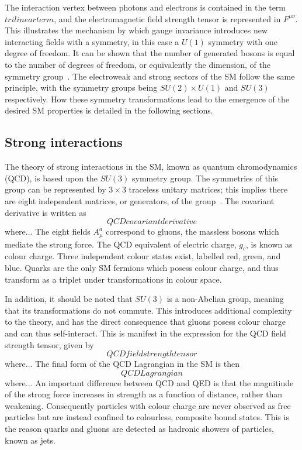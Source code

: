 The interaction vertex between photons and electrons is contained in the term $trilinear term$, 
and the electromagnetic field strength tensor is represented in $F^{\mu\nu}$.
This illustrates the mechanism by which gauge invariance introduces new interacting fields
with a symmetry, in this case a $U(1)$ symmetry with one degree of freedom.
It can be shown that the number of generated bosons is equal to the number of degrees of freedom, 
or equivalently the dimension, of the symmetry group~\cite{Peskin}.
The electroweak and strong sectors of the SM follow the same principle, 
with the symmetry groups being $SU(2) \times U(1)$ and $SU(3)$ respectively.
How these symmetry transformations lead to the emergence of the desired SM properties 
is detailed in the following sections.

\subsection{Strong interactions}

The theory of strong interactions in the SM, known as quantum chromodynamics (QCD), 
is based upon the $SU(3)$ symmetry group.
The symmetries of this group can be represented by $3\times3$ traceless unitary matrices;
this implies there are eight independent matrices, or generators, of the group~\cite{Thomson}.
The covariant derivative is written as
\begin{equation}
QCD covariant derivative
\end{equation}
where... 
The eight fields $A^{a}_{\mu}$ correspond to gluons, 
the massless bosons which mediate the strong force.
The QCD equivalent of electric charge, $g_c$, is known as colour charge.
Three independent colour states exist, labelled red, green, and blue.
Quarks are the only SM fermions which posess colour charge, 
and thus transform as a triplet under transformations in colour space.

In addition, it should be noted that $SU(3)$ is a non-Abelian group, 
meaning that its transformations do not commute.
This introduces additional complexity to the theory, 
and has the direct consequence that gluons posess colour charge and can thus self-interact.
This is manifest in the expression for the QCD field strength tensor, given by
\begin{equation}
QCD field strength tensor
\end{equation}
where... 
The final form of the QCD Lagrangian in the SM is then
\begin{equation}
QCD Lagrangian
\end{equation}
where... 
An important difference between QCD and QED is that the magnitiude of the strong force 
increases in strength as a function of distance, rather than weakening.
Consequently particles with colour charge are never observed as free particles 
but are instead confined to colourless, composite bound states.
This is the reason quarks and gluons are detected as hadronic showers of particles, 
known as jets.


